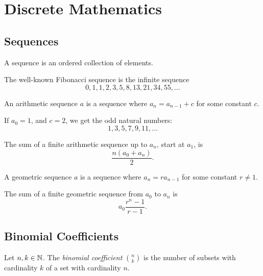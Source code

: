 \chapter{Discrete Mathematics}
\label{ch:discrete}

\section{Sequences}

\begin{defn}
    A sequence is an ordered collection of elements.
\end{defn}

\begin{exmp}
    The well-known Fibonacci sequence is the infinite sequence \[0, 1, 1, 2, 3, 5, 8, 13, 21, 34, 55, \ldots\]
\end{exmp}

\begin{defn}
    An arithmetic sequence $a$ is a sequence where $a_n = a_{n-1} + c$ for some constant $c$.
\end{defn}

\begin{exmp}
    If $a_0 = 1$, and $c = 2$, we get the odd natural numbers: \[1, 3, 5, 7, 9, 11, \ldots\]
\end{exmp}

\begin{prop}
    The sum of a finite arithmetic sequence up to $a_n$, start at $a_1$, is \[\frac{n(a_0 + a_n)}{2}.\]
\end{prop}

\begin{defn}
    A geometric sequence $a$ is a sequence where $a_n = ra_{n-1}$ for some constant $r \neq 1$.
\end{defn}

\begin{prop}
    The sum of a finite geometric sequence from $a_0$ to $a_n$ is \[a_0\frac{r^n - 1}{r - 1}.\]
\end{prop}

\section{Binomial Coefficients}

\begin{defn}\label{binomial-coefficient}
Let $n, k \in \mathbb{N}$. The \emph{binomial coefficient} $\binom{n}{k}$ is the number of subsets with cardinality $k$ of a set with cardinality $n$.
\end{defn}

